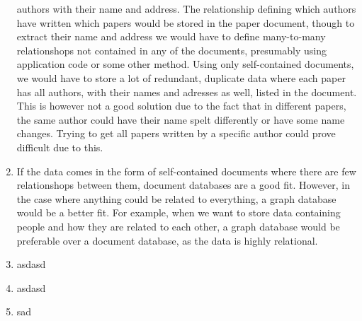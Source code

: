 \begin{enumerate}
        authors with their name and address. The relationship defining which
        authors have written which papers would be stored in the paper document,
        though to extract their name and address we would have to define 
        many-to-many relationshops not contained in any of the documents,
        presumably using application code or some other method. Using only
        self-contained documents, we would have to store a lot of redundant, 
        duplicate data where each paper has all authors, with their names and 
        adresses as well, listed in the document. This is however not a good 
        solution due to the fact that in different papers, the same author could
        have their name spelt differently or have some name changes. Trying
        to get all papers written by a specific author could prove difficult
        due to this.
    \item 
        If the data comes in the form of self-contained documents where there 
        are few relationshops between them, document databases are a good fit.
        However, in the case where anything could be related to everything, a 
        graph database would be a better fit. For example, when we want to store
        data containing people and how they are related to each other, a graph
        database would be preferable over a document database, as the data is
        highly relational.
    \item 
        asdasd 
    \item 
        asdasd
    \item
        sad
  \end{enumerate}
